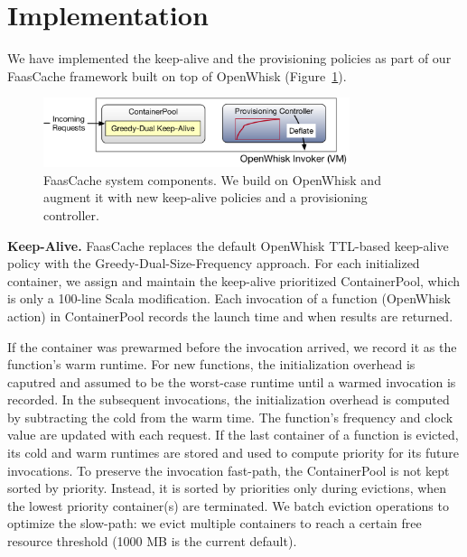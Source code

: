 \section{Implementation}

We have implemented the keep-alive and the provisioning policies as part of our FaasCache framework built on top of OpenWhisk (Figure~\ref{fig:sys}). 

\begin{figure}[t]
  \centering
  \includegraphics[width=0.8\textwidth]{faascache/faas-keepalive-20/figures/faascache.pdf}
  \caption{FaasCache system components. We build on OpenWhisk and augment it with new keep-alive policies and a provisioning controller. }
  \label{fig:sys}
\end{figure}

\noindent \textbf{Keep-Alive.}
FaasCache replaces the default OpenWhisk TTL-based keep-alive policy with the Greedy-Dual-Size-Frequency approach. 
For each initialized container, we assign and maintain the keep-alive prioritized ContainerPool, which is only a 100-line Scala modification. 
Each invocation of a function (OpenWhisk action) in ContainerPool records the launch time and when results are returned.


If the container was prewarmed before the invocation arrived, we record it as the function's warm runtime.
For new functions, the initialization overhead is caputred and assumed to be the worst-case runtime until a warmed invocation is recorded. %
In the subsequent invocations, the initialization overhead is computed by subtracting the cold from the warm time. 
The function's frequency and clock value are updated with each request.
If the last container of a function is evicted, its cold and warm runtimes are stored and used to compute priority for its future invocations. 
%
To preserve the invocation fast-path, the ContainerPool is not kept sorted by priority. 
Instead, it is sorted by priorities only during evictions, when the lowest priority container(s) are terminated.
%
We batch eviction operations to optimize the slow-path: we evict multiple containers to reach a certain free resource threshold (1000 MB is the current default). 

